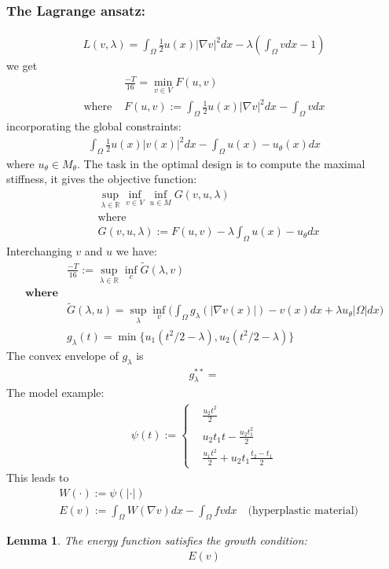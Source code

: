 \documentclass[a4paper,12pt,oneside,fleqn]{book}
\newtheorem{lemma}[theorem]{Lemma}
\theoremstyle{definition}
\theoremstyle{remark}
\begin{document}
\subsubsection{The Lagrange ansatz:}
\begin{align*}
	L(v, \lambda) = \int_\Omega \frac{1}{2} u(x) |\nabla v|^2 dx    - \lambda(\int_\Omega v dx - 1)
\end{align*}
we get
\begin{align*}
	&\frac{-T}{16} = \min_{v \in V} F(u, v)\\
	\text{where } &F(u, v) := \int_\Omega \frac{1}{2} u(x) |\nabla v|^2 dx - \int_\Omega v dx 
\end{align*}
incorporating the global constraints:
\begin{align*}
	\int_\Omega \frac{1}{2} u(x) |v(x)|^2 dx - \int_\Omega u(x) - u_\theta(x) dx
\end{align*}
where $u_\theta \in M_\theta$. The task in the optimal design is to compute the maximal stiffness, it gives the objective function:
\begin{align*}
	 &\sup_{\lambda \in \mathbb{R}} \inf_{v \in V} \inf_{u \in M}  G(v, u, \lambda) \\
	 &\text{where}\\
	 &G(v, u, \lambda) := F(u, v) - \lambda \int_\Omega u(x) - u_\theta dx 
\end{align*}
Interchanging $v$ and $u$ we have:
\begin{align*}
	&\frac{-T}{16} := \sup_{\lambda \in \mathbb{R}} \inf_c \tilde{G}(\lambda , v)\\
	\textbf{where}\\
	&\tilde{G}(\lambda, u) = \sup_\lambda \inf_v \bigg
	( \int_\Omega g_\lambda (|\nabla v(x)|) - v(x)dx + \lambda u_\theta |\Omega|dx \bigg)\\
	&g_\lambda (t) = \min\{u_1(t^2 \slash 2 - \lambda), u_2(t^2\slash 2 - \lambda)\}
\end{align*}
The convex envelope of $g_\lambda$ is 
\begin{align*}
	g_\lambda^{**}= 
\end{align*}
The model example:
\begin{align*}
	\psi(t):= \left\{
	\begin{aligned}
		&\frac{u_2 t^2}{2}\\
		&u_2 t_1 t - \frac{u_2 t_1^2}{2}\\
		&\frac{u_1 t^2}{2} + u_2 t_1 \frac{t_2 - t_1}{2}
	\end{aligned}
	\right.
\end{align*}
This leads to 
\begin{align*}
	&W(\cdot):= \psi(|\cdot|)\\
	&E(v) := \int_\Omega W(\nabla v) dx - \int_\Omega fv dx
	\quad \text{(hyperplastic material)}
\end{align*}
\begin{lemma}
	The energy function satisfies the growth condition:
	\begin{align*}
		E(v)
	\end{align*}
\end{lemma}
\end{document}
